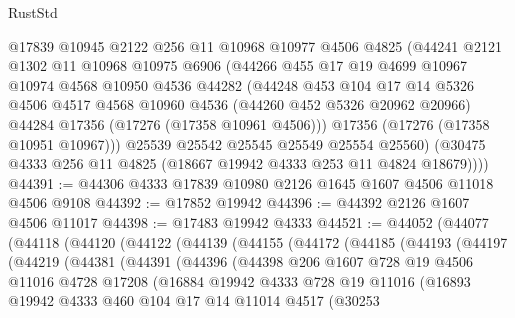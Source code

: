 \begin{lexlean}{RustStd}
\begin{coremodule}
        @17839
        @10945
        @2122
        @256
        @11
        @10968
        @10977
        @4506
        @4825
        (@44241
          @2121
          @1302
          @11
          @10968
          @10975
          @6906
          (@44266
            @455
            @17
            @19
            @4699
            @10967
            @10974
            @4568
            @10950
            @4536
            @44282
            (@44248
              @453
              @104
              @17
              @14
              @5326
              @4506
              @4517
              @4568
              @10960
              @4536
              (@44260 @452 @5326 @20962 @20966)
              @44284
              @17356
              (@17276 (@17358 @10961 @4506)))
            @17356
            (@17276 (@17358 @10951 @10967)))
          @25539
          @25542
          @25545
          @25549
          @25554
          @25560)
        (@30475 @4333 @256 @11 @4825 (@18667 @19942 @4333 @253 @11 @4824 @18679))))
@44391 := @44306 @4333 @17839 @10980 @2126 @1645 @1607 @4506 @11018 @4506 @9108
@44392 := @17852 @19942
@44396 := @44392 @2126 @1607 @4506 @11017
@44398 := @17483 @19942 @4333
@44521 := @44052
    (@44077
      (@44118
        (@44120
          (@44122
            (@44139
              (@44155
                (@44172
                  (@44185
                    (@44193
                      (@44197
                        (@44219
                          (@44381
                            (@44391
                              (@44396
                                (@44398
                                  @206
                                  @1607
                                  @728
                                  @19
                                  @4506
                                  @11016
                                  @4728
                                  @17208
                                  (@16884
                                    @19942
                                    @4333
                                    @728
                                    @19
                                    @11016
                                    (@16893
                                      @19942
                                      @4333
                                      @460
                                      @104
                                      @17
                                      @14
                                      @11014
                                      @4517
                                      (@30253

\end{coremodule}
\end{lexlean}
